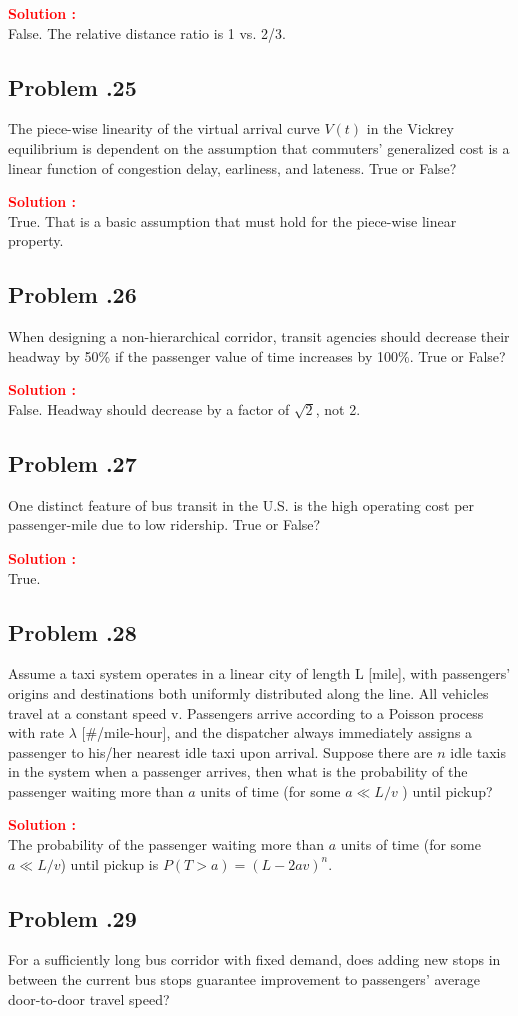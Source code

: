 \documentclass[12pt]{article}
\newcommand{\customsubsection}[1]{
  \subsection*{Problem \thesection.#1}
}
\begin{document}
\textbf{\textcolor{red}{Solution :}} \\
False. The relative distance ratio is 1 vs. 2/3.
\newpage


\customsubsection{25}
The piece-wise linearity of the virtual arrival curve $V(t)$ in the Vickrey equilibrium is dependent on the assumption that commuters’ generalized cost is a linear function of congestion delay, earliness, and lateness. True or False?

\textbf{\textcolor{red}{Solution :}} \\
True. That is a basic assumption that must hold for the piece-wise linear property.
\newpage

\customsubsection{26}
When designing a non-hierarchical corridor, transit agencies should decrease their headway by  50\% if the passenger value of time increases by 100\%. True or False?

\textbf{\textcolor{red}{Solution :}} \\
False. Headway should decrease by a factor of $\sqrt{2}$, not 2.


\newpage

\customsubsection{27}
One distinct feature of bus transit in the U.S. is the high operating cost per passenger-mile due to low ridership. True or False?

\textbf{\textcolor{red}{Solution :}} \\
True. 
\newpage




\customsubsection{28}
Assume a taxi system operates in a linear city of length L [mile], with passengers’ origins and destinations both uniformly distributed along the line. All vehicles travel at a constant speed v. Passengers arrive according to a Poisson process with rate $\lambda$ [\#/mile-hour], and the dispatcher always immediately assigns a passenger to his/her nearest idle taxi upon arrival. Suppose there are $n$ idle taxis in the system when a passenger arrives, then what is the probability of the passenger waiting more than $a$ units of time (for some $a \ll L/v$ ) until pickup? 

\textbf{\textcolor{red}{Solution :}} \\
The probability of the passenger waiting more than $a$ units of time (for some $a \ll L/v $) until pickup is  \( P(T > a) = (L-2av)^n \).


\newpage


\customsubsection{29}
For a sufficiently long bus corridor with fixed demand, does adding new stops in between the current bus stops guarantee improvement to passengers’ average door-to-door travel speed? 
\end{document}
